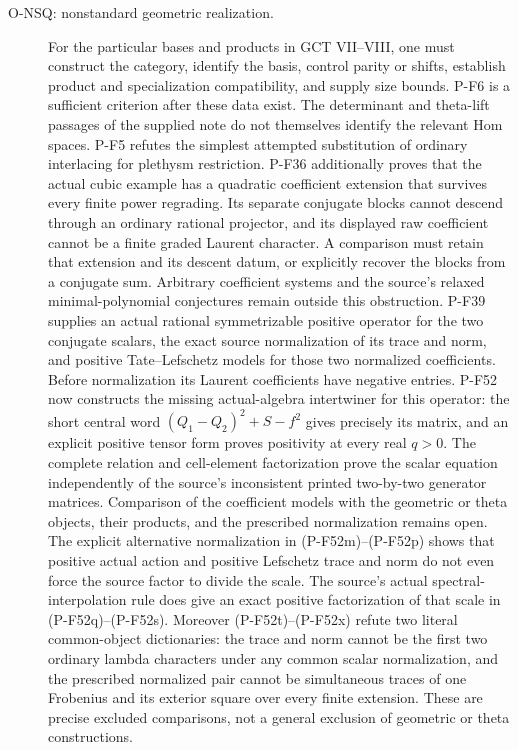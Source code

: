 \documentclass[11pt,a4paper]{article}
\begin{document}
\begin{description}
\item[O-NSQ: nonstandard geometric realization.]
For the particular bases and products in GCT VII--VIII, one must construct
the category, identify the basis, control parity or shifts, establish
product and specialization compatibility, and supply size bounds.
P-F6 is a sufficient criterion after these data exist. The determinant
and theta-lift passages of the supplied note do not themselves identify
the relevant Hom spaces. P-F5 refutes the simplest attempted substitution
of ordinary interlacing for plethysm restriction.
P-F36 additionally proves that the actual cubic example has a
quadratic coefficient extension that survives every finite power
regrading. Its separate conjugate blocks cannot descend through
an ordinary rational projector, and its displayed raw coefficient
cannot be a finite graded Laurent character. A comparison must
retain that extension and its descent datum, or explicitly recover
the blocks from a conjugate sum. Arbitrary coefficient systems
and the source's relaxed minimal-polynomial conjectures remain
outside this obstruction.
P-F39 supplies an actual rational symmetrizable positive operator
for the two conjugate scalars, the exact source normalization of
its trace and norm, and positive Tate--Lefschetz models for those
two normalized coefficients. Before normalization its Laurent
coefficients have negative entries. P-F52 now constructs the
missing actual-algebra intertwiner for this operator: the short
central word $(Q_1-Q_2)^2+S-f^2$ gives precisely its matrix,
and an explicit positive tensor form proves positivity at every
real $q>0$. The complete relation and cell-element factorization
prove the scalar equation independently of the source's
inconsistent printed two-by-two generator matrices. Comparison
of the coefficient models with the geometric or theta objects,
their products, and the prescribed normalization remains open.
The explicit alternative normalization in (P-F52m)--(P-F52p)
shows that positive actual action and positive Lefschetz trace
and norm do not even force the source factor to divide the scale.
The source's actual spectral-interpolation rule does give an
exact positive factorization of that scale in (P-F52q)--(P-F52s).
Moreover (P-F52t)--(P-F52x) refute two literal common-object
dictionaries: the trace and norm cannot be the first two ordinary
lambda characters under any common scalar normalization, and
the prescribed normalized pair cannot be simultaneous traces of
one Frobenius and its exterior square over every finite extension.
These are precise excluded comparisons, not a general exclusion
of geometric or theta constructions.


\end{description}
\end{document}
